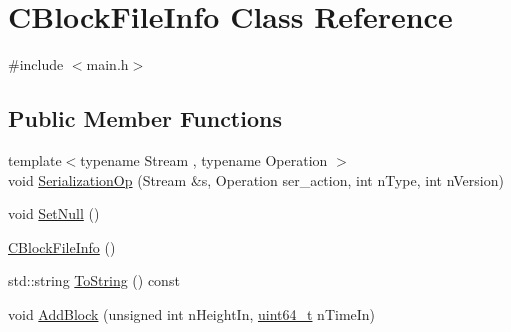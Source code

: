 \hypertarget{class_c_block_file_info}{}\section{C\+Block\+File\+Info Class Reference}
\label{class_c_block_file_info}


{\ttfamily \#include $<$main.\+h$>$}

\subsection*{Public Member Functions}
\begin{DoxyCompactItemize}
\item 
{\footnotesize template$<$typename Stream , typename Operation $>$ }\\void \hyperlink{class_c_block_file_info_a5d48a4fe1f8b3903131d121fc14a5a6f}{Serialization\+Op} (Stream \&s, Operation ser\+\_\+action, int n\+Type, int n\+Version)
\item 
void \hyperlink{class_c_block_file_info_a21bd4f8e92c47646737fc57446a86cc2}{Set\+Null} ()
\item 
\hyperlink{class_c_block_file_info_a4d08bfcfc45a16b40266255f8597c949}{C\+Block\+File\+Info} ()
\item 
std\+::string \hyperlink{class_c_block_file_info_a90d40a769ca47c075757c1b9037c88f3}{To\+String} () const 
\item 
void \hyperlink{class_c_block_file_info_a66867569ffe06068b8c6eb1139934fbf}{Add\+Block} (unsigned int n\+Height\+In, \hyperlink{stdint_8h_aaa5d1cd013383c889537491c3cfd9aad}{uint64\+\_\+t} n\+Time\+In)
\end{DoxyCompactItemize}
